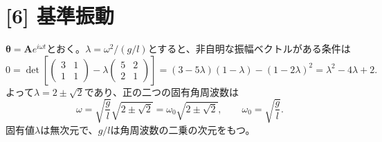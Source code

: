 \documentclass[11pt,a4paper]{article}
\begin{document}
\section*{[6] 基準振動}
$\boldsymbol\theta=\boldsymbol A e^{i\omega t}$とおく。$\lambda=\omega^2/(g/l)$とすると、非自明な振幅ベクトルがある条件は
\begin{equation}
  0=\det\left[
  \begin{pmatrix}3&1\\1&1\end{pmatrix}
  -\lambda\begin{pmatrix}5&2\\2&1\end{pmatrix}\right]
  =(3-5\lambda)(1-\lambda)-(1-2\lambda)^2
  =\lambda^2-4\lambda+2.
\end{equation}
よって$\lambda=2\pm\sqrt{2}$であり、正の二つの固有角周波数は
\begin{equation}
  \boxed{\omega=\sqrt{\frac{g}{l}}\sqrt{2\pm\sqrt{2}}
  =\omega_0\sqrt{2\pm\sqrt{2}},\qquad \omega_0=\sqrt{\frac{g}{l}}.}
\end{equation}
固有値$\lambda$は無次元で、$g/l$は角周波数の二乗の次元をもつ。
\end{document}

